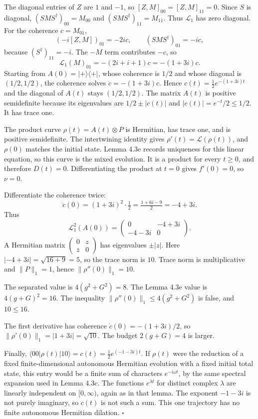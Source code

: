 \documentclass[
  11pt,
]{article}
\begin{document}
The diagonal entries of \(Z\) are \(1\) and \(-1\), so
\([Z,M]_{00}=[Z,M]_{11}=0\). Since \(S\) is diagonal,
\((SMS^\dagger)_{00}=M_{00}\) and \((SMS^\dagger)_{11}=M_{11}\). Thus
\(\mathcal L_1\) has zero diagonal. For the coherence
\(c=M_{01}\),
\[
(-i[Z,M])_{01}=-2ic,\qquad
(SMS^\dagger)_{01}=-ic,
\]
because \((S^\dagger)_{11}=-i\). The \(-M\) term contributes \(-c\), so
\[
\mathcal L_1(M)_{01}=-(2i+i+1)c=-(1+3i)c.
\]
Starting from \(A(0)=|+\rangle\langle+|\), whose coherence is \(1/2\)
and whose diagonal is \((1/2,1/2)\), the coherence solves
\(\dot c=-(1+3i)c\). Hence
\(c(t)=\tfrac12 e^{-(1+3i)t}\) and the diagonal of \(A(t)\) stays
\((1/2,1/2)\). The matrix \(A(t)\) is positive semidefinite because its
eigenvalues are \(1/2\pm|c(t)|\) and \(|c(t)|=e^{-t}/2\le 1/2\). It has
trace one.

The product curve \(\rho(t)=A(t)\otimes P\) is Hermitian, has trace one,
and is positive semidefinite. The intertwining identity gives
\(\rho'(t)=\mathcal L(\rho(t))\), and \(\rho(0)\) matches the initial
state. Lemma 4.3e records uniqueness for this linear equation, so this
curve is the mixed evolution. It is a product for every \(t\ge 0\), and
therefore \(D(t)=0\). Differentiating the product at \(t=0\) gives
\(f'(0)=0\), so \(\nu=0\).

Differentiate the coherence twice:
\[
\ddot c(0)=(1+3i)^2\cdot\tfrac12=\tfrac{1+6i-9}{2}=-4+3i.
\]
Thus
\[
\mathcal L_1^2(A(0))
=\begin{pmatrix}0&-4+3i\\-4-3i&0\end{pmatrix}.
\]
A Hermitian matrix \(\begin{pmatrix}0&z\\\bar z&0\end{pmatrix}\) has
eigenvalues \(\pm|z|\). Here \(|-4+3i|=\sqrt{16+9}=5\), so the trace
norm is \(10\). Trace norm is multiplicative and \(\|P\|_1=1\), hence
\(\|\rho''(0)\|_1=10\).

The separated value is \(4(g^2+G^2)=8\). The Lemma 4.3e value is
\(4(g+G)^2=16\). The inequality
\(\|\rho''(0)\|_1\le 4(g^2+G^2)\) is false, and \(10\le 16\).

The first derivative has coherence \(\dot c(0)=-(1+3i)/2\), so
\(\|\rho'(0)\|_1=|1+3i|=\sqrt{10}\). The budget \(2(g+G)=4\) is larger.

Finally, \(\langle00|\rho(t)|10\rangle=c(t)=\tfrac12 e^{(-1-3i)t}\).
If \(\rho(t)\) were the reduction of a fixed finite-dimensional autonomous Hermitian
evolution with a fixed initial total state, this entry would be a finite sum of characters
\(e^{-i\omega t}\), by the same spectral expansion used in Lemma 4.3c.
The functions \(e^{\lambda t}\) for distinct complex \(\lambda\) are
linearly independent on \([0,\infty)\), again as in that lemma. The
exponent \(-1-3i\) is not purely imaginary, so \(c(t)\) is not such a
sum. This one trajectory has no finite autonomous Hermitian dilation. \(\square\)
\end{document}
